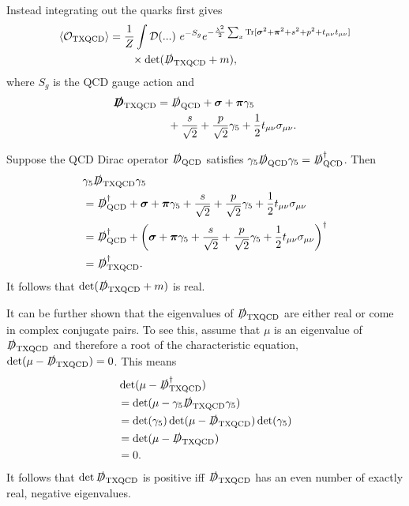 \documentclass[%
    twocolumn,
superscriptaddress,
preprintnumbers,
nofootinbib,
 amsmath,amssymb,
 aps,
 prd,
 floatfix,
]{revtex4-2}
\newcommand{\qcd}[0]{\text{QCD}}
\newcommand{\txqcd}[0]{\text{TXQCD}}
\begin{document}
Instead integrating out the quarks first gives
\begin{equation}\label{eq:TXQCD}
\begin{split}
\left< \mathcal{O}_{\txqcd} \right> 
&= \frac{1}{Z} \int \mathcal{D}(...) \ e^{-S_g} e^{-\frac{\lambda^2}{2} \sum_x \text{Tr}[\bm{\sigma}^2+ \bm{\pi}^2 + s^2 + p^2 + t_{\mu\nu}t_{\mu\nu} ]} \\
&\hspace{20pt} \times \det(\slashed{D}_{\txqcd} + m),
\end{split}
\end{equation}
where $S_g$ is the QCD gauge action and
\begin{equation}
\begin{split}
     \bm{\slashed{D}}_{\txqcd} &= \slashed{D}_{\qcd} + \bm{\sigma} + \bm{\pi} \gamma_5   \\
    &\hspace{10pt} + \frac{s}{\sqrt{2}} + \frac{p}{\sqrt{2}} \gamma_5 + \frac{1}{2} t_{\mu\nu}\sigma_{\mu\nu}.
    \end{split}
\end{equation}

Suppose the QCD Dirac operator $\slashed{D}_{\qcd}$ satisfies $\gamma_5 \slashed{D}_{\qcd} \gamma_5 = \slashed{D}_{\qcd}^\dagger$.
Then
\begin{equation}
\begin{split}
    &\gamma_5 \slashed{D}_{\txqcd} \gamma_5 \\
    &= \slashed{D}_{\qcd}^\dagger + \bm{\sigma} + \bm{\pi} \gamma_5  + \frac{s}{\sqrt{2}} + \frac{p}{\sqrt{2}} \gamma_5 + \frac{1}{2} t_{\mu\nu}\sigma_{\mu\nu} \\
    &= \slashed{D}_{\qcd}^\dagger + \left( \bm{\sigma} + \bm{\pi} \gamma_5  + \frac{s}{\sqrt{2}} + \frac{p}{\sqrt{2}} \gamma_5 + \frac{1}{2} t_{\mu\nu}\sigma_{\mu\nu} \right)^\dagger \\
    &= \slashed{D}_{\txqcd}^\dagger.
    \end{split}
\end{equation}
It follows that $\det(\slashed{D}_{\txqcd} + m)$ is real.

It can be further shown that the eigenvalues of $\slashed{D}_{\txqcd}$ are either real or come in complex conjugate pairs.
To see this, assume that $\mu$ is an eigenvalue of $\slashed{D}_{\txqcd}$ and therefore a root of the characteristic equation, $\det(\mu  - \slashed{D}_{\txqcd}) = 0$.
This means
\begin{equation}
    \begin{split}
        & \det(\mu -  \slashed{D}_{\txqcd}^\dagger ) \\
        &=  \det(\mu  - \gamma_5 \slashed{D}_{\txqcd} \gamma_5 ) \\
        &= \det(\gamma_5) \det(\mu  - \slashed{D}_{\txqcd} ) \det( \gamma_5 ) \\
        &= \det(\mu - \slashed{D}_{\txqcd}) \\
        &= 0.
    \end{split}
\end{equation}
It follows that $\det \slashed{D}_{\txqcd}$ is positive iff $\slashed{D}_{\txqcd}$ has an even number of exactly real, negative eigenvalues.
\end{document}
